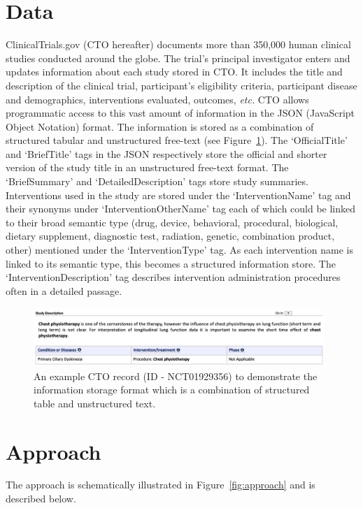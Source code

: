 \documentclass[11pt]{article}
\begin{document}
\section{Data}
\label{sec:data}
%
ClinicalTrials.gov (CTO hereafter) documents more than 350,000 human clinical studies conducted around the globe.
The trial's principal investigator enters and updates information about each study stored in CTO.
It includes the title and description of the clinical trial, participant's eligibility criteria, participant disease and demographics, interventions evaluated, outcomes, \textit{etc.}
CTO allows programmatic access to this vast amount of information in the JSON (JavaScript Object Notation) format.
The information is stored as a combination of structured tabular and unstructured free-text (see Figure~\ref{fig:CTO_example}).
The `OfficialTitle' and `BriefTitle' tags in the JSON respectively store the official and shorter version of the study title in an unstructured free-text format.
The `BriefSummary' and `DetailedDescription' tags store study summaries.
Interventions used in the study are stored under the `InterventionName' tag and their synonyms under `InterventionOtherName' tag each of which could be linked to their broad semantic type (drug, device, behavioral, procedural, biological, dietary supplement, diagnostic test, radiation, genetic, combination product, other) mentioned under the `InterventionType' tag.
As each intervention name is linked to its semantic type, this becomes a structured information store.
The `InterventionDescription' tag describes intervention administration procedures often in a detailed passage.
%
\begin{figure}[t]
\centering
\includegraphics[width=0.98\textwidth]{figures/example_figure1.png}
\caption{An example CTO record (ID - NCT01929356) to demonstrate the information storage format which is a combination of structured table and unstructured text.}
\label{fig:CTO_example}
\end{figure}
%
%
%
%
\section{Approach}
\label{sec:methods}
%
The approach is schematically illustrated in Figure~\ref{fig:approach} and is described below.
%
\end{document}
